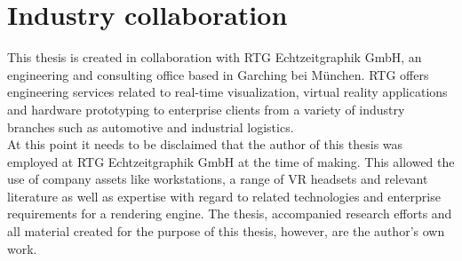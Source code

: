 \section{Industry collaboration}
This thesis is created in collaboration with RTG Echtzeitgraphik GmbH, an engineering and consulting office based in Garching bei München. RTG offers engineering services related to real-time visualization, virtual reality applications and hardware prototyping to enterprise clients from a variety of industry branches such as automotive and industrial logistics\cite{HansiVollmer.2020}. \\
At this point it needs to be disclaimed that the author of this thesis was employed at RTG Echtzeitgraphik GmbH at the time of making. This allowed the use of company assets like workstations, a range of VR headsets and relevant literature as well as expertise with regard to related technologies and enterprise requirements for a rendering engine. The thesis, accompanied research efforts and all material created for the purpose of this thesis, however, are the author's own work. 


